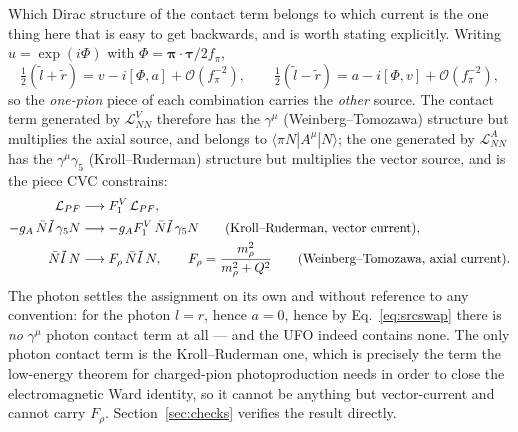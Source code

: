 \documentclass[11pt,a4paper]{article}
\begin{document}
Which Dirac structure of the contact term belongs to which current is the one
thing here that is easy to get backwards, and is worth stating explicitly.
Writing $u = \exp(i\Phi)$ with $\Phi = \boldsymbol\pi\!\cdot\!\boldsymbol\tau/2f_\pi$,
\begin{equation}
  \tfrac12(\tilde l + \tilde r) = v - i[\Phi, a] + \mathcal{O}(f_\pi^{-2}),
  \qquad
  \tfrac12(\tilde l - \tilde r) = a - i[\Phi, v] + \mathcal{O}(f_\pi^{-2}),
  \label{eq:srcswap}
\end{equation}
so the \emph{one-pion} piece of each combination carries the \emph{other}
source. The contact term generated by $\mathcal{L}_{NN}^{V}$ therefore has the
$\gamma^\mu$ (Weinberg--Tomozawa) structure but multiplies the axial source,
and belongs to $\langle \pi N|A^\mu|N\rangle$; the one generated by
$\mathcal{L}_{NN}^{A}$ has the $\gamma^\mu\gamma_5$ (Kroll--Ruderman) structure
but multiplies the vector source, and is the piece CVC constrains:
\begin{align}
  \mathcal{L}_{PF} &\longrightarrow F_1^V\,\mathcal{L}_{PF} ,\\
  -g_A\,\bar N \slashed{\tilde l}\,\gamma_5 N &\longrightarrow
      -g_A F_1^V\, \bar N \slashed{\tilde l}\,\gamma_5 N
      \qquad\text{(Kroll--Ruderman, vector current)}, \\
  \bar N \slashed{\tilde l}\, N &\longrightarrow F_\rho\,
      \bar N \slashed{\tilde l}\, N ,
      \qquad F_\rho = \frac{m_\rho^2}{m_\rho^2+Q^2}
      \qquad\text{(Weinberg--Tomozawa, axial current)} .
\end{align}
The photon settles the assignment on its own and without reference to any
convention: for the photon $l = r$, hence $a = 0$, hence by
Eq.~\eqref{eq:srcswap} there is \emph{no} $\gamma^\mu$ photon contact term at
all --- and the UFO indeed contains none. The only photon contact term is the
Kroll--Ruderman one, which is precisely the term the low-energy theorem for
charged-pion photoproduction needs in order to close the electromagnetic Ward
identity, so it cannot be anything but vector-current and cannot carry
$F_\rho$. Section~\ref{sec:checks} verifies the result directly.
\end{document}
